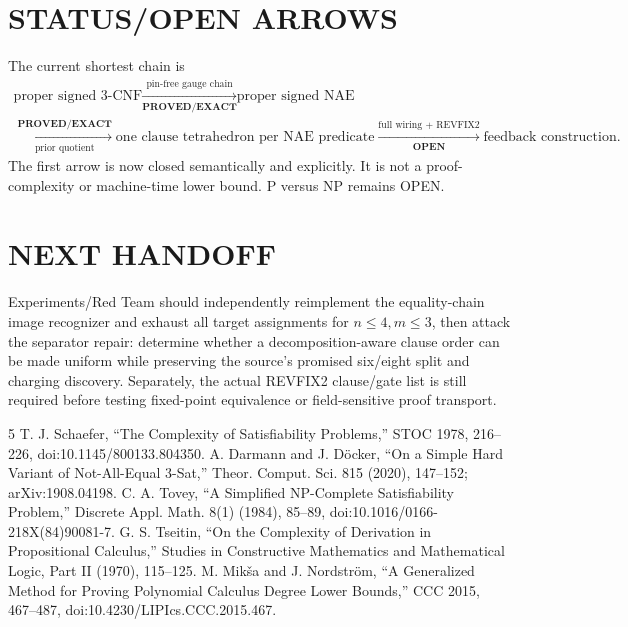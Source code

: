 \documentclass[11pt]{article}
\newcommand{\EXACT}{\textbf{PROVED/EXACT}}
\newcommand{\OPEN}{\textbf{OPEN}}
\begin{document}
\section{STATUS/OPEN ARROWS}
The current shortest chain is
\[
\begin{array}{c}
\text{proper signed 3-CNF}\xrightarrow[\EXACT]{\text{pin-free gauge chain}}
\text{proper signed NAE}\\[2mm]
\xrightarrow[\text{prior quotient}]{\EXACT}
\text{one clause tetrahedron per NAE predicate}
\xrightarrow[\OPEN]{\text{full wiring + REVFIX2}}
\text{feedback construction}.
\end{array}
\]
The first arrow is now closed semantically and explicitly.  It is not a
proof-complexity or machine-time lower bound.  P versus NP remains OPEN.

\section{NEXT HANDOFF}
Experiments/Red Team should independently reimplement the equality-chain image
recognizer and exhaust all target assignments for $n\le4,m\le3$, then attack
the separator repair: determine whether a decomposition-aware clause order can
be made uniform while preserving the source's promised six/eight split and
charging discovery.  Separately, the actual REVFIX2 clause/gate list is still
required before testing fixed-point equivalence or field-sensitive proof
transport.

\begin{thebibliography}{5}
 T. J. Schaefer, ``The Complexity of Satisfiability
Problems,'' STOC 1978, 216--226, doi:10.1145/800133.804350.
 A. Darmann and J. D\"ocker, ``On a Simple Hard Variant of
Not-All-Equal 3-Sat,'' Theor. Comput. Sci. 815 (2020), 147--152;
arXiv:1908.04198.
 C. A. Tovey, ``A Simplified NP-Complete Satisfiability
Problem,'' Discrete Appl. Math. 8(1) (1984), 85--89,
doi:10.1016/0166-218X(84)90081-7.
 G. S. Tseitin, ``On the Complexity of Derivation in
Propositional Calculus,'' Studies in Constructive Mathematics and Mathematical
Logic, Part II (1970), 115--125.
 M. Mik\v{s}a and J. Nordstr\"om, ``A Generalized Method for
Proving Polynomial Calculus Degree Lower Bounds,'' CCC 2015, 467--487,
doi:10.4230/LIPIcs.CCC.2015.467.
\end{thebibliography}
\end{document}
